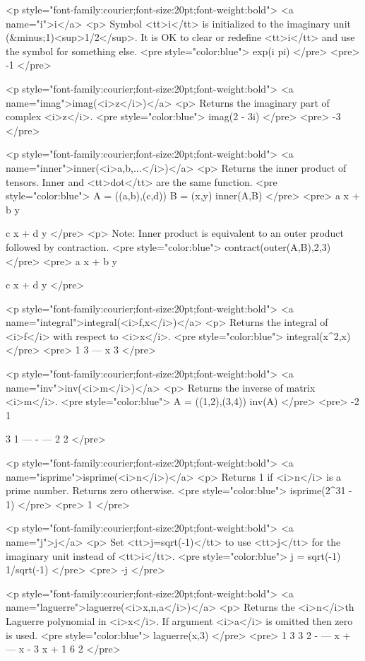 \iffalse

<p style="font-family:courier;font-size:20pt;font-weight:bold">
<a name="i">i</a>
<p>
Symbol <tt>i</tt> is initialized to the imaginary unit (&minus;1)<sup>1/2</sup>.
It is OK to clear or redefine <tt>i</tt> and use the symbol for something else.
<pre style="color:blue">
exp(i pi)
</pre>
<pre>
-1
</pre>

<p style="font-family:courier;font-size:20pt;font-weight:bold">
<a name="imag">imag(<i>z</i>)</a>
<p>
Returns the imaginary part of complex <i>z</i>.
<pre style="color:blue">
imag(2 - 3i)
</pre>
<pre>
-3
</pre>

<p style="font-family:courier;font-size:20pt;font-weight:bold">
<a name="inner">inner(<i>a,b,...</i>)</a>
<p>
Returns the inner product of tensors.
Inner and <tt>dot</tt> are the same function.
<pre style="color:blue">
A = ((a,b),(c,d))
B = (x,y)
inner(A,B)
</pre>
<pre>
a x + b y

c x + d y
</pre>
<p>
Note: Inner product is equivalent to an outer product followed by contraction.
<pre style="color:blue">
contract(outer(A,B),2,3)
</pre>
<pre>
a x + b y

c x + d y
</pre>

<p style="font-family:courier;font-size:20pt;font-weight:bold">
<a name="integral">integral(<i>f,x</i>)</a>
<p>
Returns the integral of <i>f</i> with respect to <i>x</i>.
<pre style="color:blue">
integral(x^2,x)
</pre>
<pre>
 1   3
--- x
 3
</pre>

<p style="font-family:courier;font-size:20pt;font-weight:bold">
<a name="inv">inv(<i>m</i>)</a>
<p>
Returns the inverse of matrix <i>m</i>.
<pre style="color:blue">
A = ((1,2),(3,4))
inv(A)
</pre>
<pre>
 -2       1


  3        1
 ---    - ---
  2        2
</pre>

<p style="font-family:courier;font-size:20pt;font-weight:bold">
<a name="isprime">isprime(<i>n</i>)</a>
<p>
Returns 1 if <i>n</i> is a prime number. Returns zero otherwise.
<pre style="color:blue">
isprime(2^31 - 1)
</pre>
<pre>
1
</pre>

<p style="font-family:courier;font-size:20pt;font-weight:bold">
<a name="j">j</a>
<p>
Set <tt>j=sqrt(-1)</tt> to use <tt>j</tt> for the imaginary unit instead of <tt>i</tt>.
<pre style="color:blue">
j = sqrt(-1)
1/sqrt(-1)
</pre>
<pre>
-j
</pre>

<p style="font-family:courier;font-size:20pt;font-weight:bold">
<a name="laguerre">laguerre(<i>x,n,a</i>)</a>
<p>
Returns the <i>n</i>th Laguerre polynomial in <i>x</i>.
If argument <i>a</i> is omitted then zero is used.
<pre style="color:blue">
laguerre(x,3)
</pre>
<pre>
   1   3    3   2
- --- x  + --- x  - 3 x + 1
   6        2
</pre>

